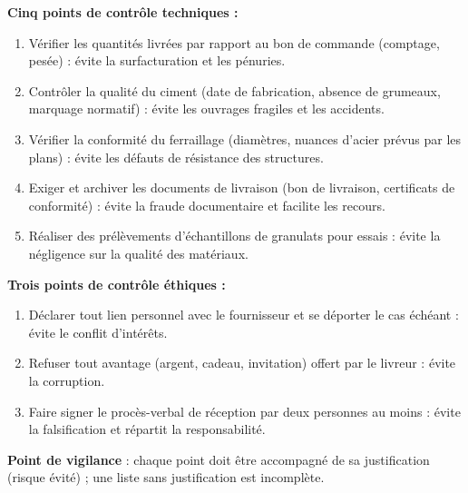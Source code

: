 \documentclass[11pt]{article}
\begin{document}
\begin{corrige}
\textbf{Cinq points de contrôle techniques :}
\begin{enumerate}
\item Vérifier les quantités livrées par rapport au bon de commande (comptage, pesée) : évite la surfacturation et les pénuries.
\item Contrôler la qualité du ciment (date de fabrication, absence de grumeaux, marquage normatif) : évite les ouvrages fragiles et les accidents.
\item Vérifier la conformité du ferraillage (diamètres, nuances d'acier prévus par les plans) : évite les défauts de résistance des structures.
\item Exiger et archiver les documents de livraison (bon de livraison, certificats de conformité) : évite la fraude documentaire et facilite les recours.
\item Réaliser des prélèvements d'échantillons de granulats pour essais : évite la négligence sur la qualité des matériaux.
\end{enumerate}
\textbf{Trois points de contrôle éthiques :}
\begin{enumerate}
\item Déclarer tout lien personnel avec le fournisseur et se déporter le cas échéant : évite le conflit d'intérêts.
\item Refuser tout avantage (argent, cadeau, invitation) offert par le livreur : évite la corruption.
\item Faire signer le procès-verbal de réception par deux personnes au moins : évite la falsification et répartit la responsabilité.
\end{enumerate}
\textbf{Point de vigilance} : chaque point doit être accompagné de sa justification (risque évité) ; une liste sans justification est incomplète.
\end{corrige}
\end{document}
